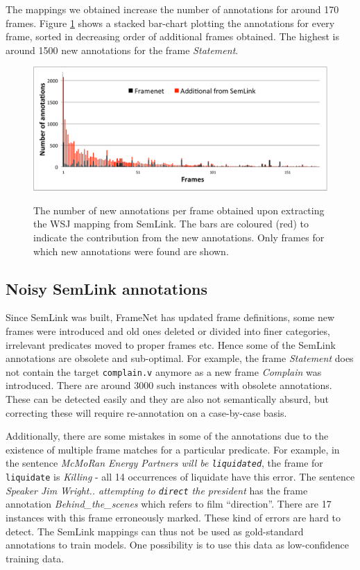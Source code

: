 \documentclass[11pt]{article}
\begin{document}
The mappings we obtained increase the number of annotations for around 170 frames. Figure \ref{fig:framesBarchart} shows a stacked bar-chart plotting the annotations for every frame, sorted in decreasing order of additional frames obtained. The highest is around 1500 new annotations for the frame \textit{Statement}.
\begin{figure}
\caption{The number of new annotations per frame obtained upon extracting the WSJ mapping from SemLink. The bars are coloured (red) to indicate the contribution from the new annotations. Only frames for which new annotations were found are shown.}
\includegraphics[scale=0.5]{framesBarchart.pdf}
\label{fig:framesBarchart}
\end{figure}

\subsection{Noisy SemLink annotations}
Since SemLink was built, FrameNet has updated frame definitions, some new frames were introduced and old ones deleted or divided into finer categories, irrelevant predicates moved to proper frames etc. Hence some of the SemLink annotations are obsolete and sub-optimal. For example, the frame \textit{Statement} does not contain the target \texttt{complain.v} anymore as a new frame \textit{Complain} was introduced. There are around 3000 such instances with obsolete annotations. These can be detected easily and they are also not semantically absurd, but correcting these will require re-annotation on a case-by-case basis.

Additionally, there are some mistakes in some of the annotations due to the existence of multiple frame matches for a particular predicate. For example, in the sentence \textit{McMoRan Energy Partners will be \texttt{liquidated}}, the frame for \texttt{liquidate} is \textit{Killing} - all 14 occurrences of liquidate have this error. The sentence \textit{Speaker Jim Wright.. attempting to \texttt{direct} the president} has the frame annotation \textit{Behind\_the\_scenes} which refers to film ``direction''. There are 17 instances with this frame erroneously marked. These kind of errors are hard to detect. The SemLink mappings can thus not be used as gold-standard annotations to train models. One possibility is to use this data as low-confidence training data.
\end{document}
